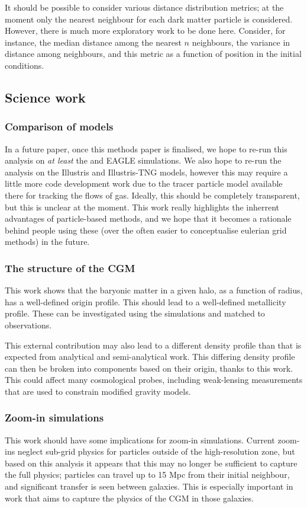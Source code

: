 It should be possible to consider various distance distribution metrics; at the
moment only the nearest neighbour for each dark matter particle is considered.
However, there is much more exploratory work to be done here. Consider, for
instance, the median distance among the nearest $n$ neighbours, the variance in
distance among neighbours, and this metric as a function of position in the
initial conditions.

\subsection{Science work}

\subsubsection{Comparison of models}

In a future paper, once this methods paper is finalised, we hope to re-run
this analysis on \emph{at least} the \mufasa{} and EAGLE simulations. We
also hope to re-run the analysis on the Illustris and Illustris-TNG models,
however this may require a little more code development work due to the
tracer particle model available there for tracking the flows of gas. Ideally,
this should be completely transparent, but this is unclear at the moment.
This work really highlights the inherrent advantages of particle-based
methods, and we hope that it becomes a rationale behind people using these
(over the often easier to conceptualise eulerian grid methods) in the future.

\subsubsection{The structure of the CGM}

This work shows that the baryonic matter in a given halo, as a function of
radius, has a well-defined origin profile. This should lead to a well-defined
metallicity profile. These can be investigated using the \simba{} simulations
and matched to observations.

This external contribution may also lead to a different density profile than
that is expected from analytical and semi-analytical work. This differing
density profile can then be broken into components based on their origin,
thanks to this work. This could affect many cosmological probes, including
weak-lensing measurements that are used to constrain modified gravity models.

\subsubsection{Zoom-in simulations}

This work should have some implications for zoom-in simulations. Current zoom-ins
neglect sub-grid physics for particles outside of the high-resolution zone,
but based on this analysis it appears that this may no longer be sufficient
to capture the full physics; particles can travel up to 15 Mpc from their
initial neighbour, and significant transfer is seen between galaxies. This is
especially important in work that aims to capture the physics of the CGM in
those galaxies.
